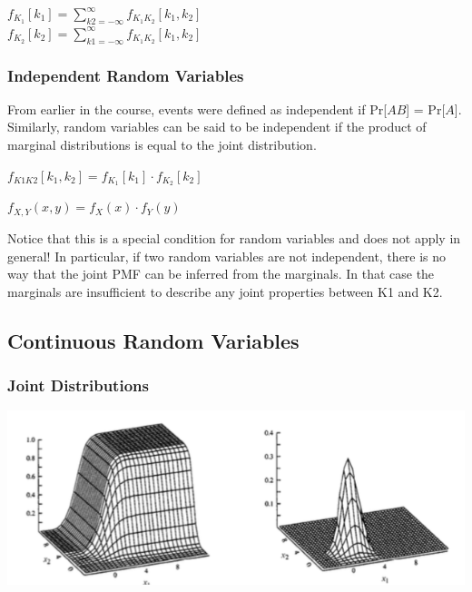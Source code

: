 \documentclass[11pt]{article}
\begin{document}
\begin{center}
    $f_{K_1}[k_1] = \sum\limits_{k2=-\infty}^\infty f_{K_1K_2}[k_1,k_2]$ \\

    $f_{K_2}[k_2] = \sum\limits_{k1=-\infty}^\infty f_{K_1K_2}[k_1,k_2]$    
\end{center}


\subsubsection{Independent Random Variables}

From earlier in the course, events were defined as independent if Pr[$AB$] = Pr[$A$]. Similarly, random variables can be said to be independent if the product of marginal distributions is equal to the joint distribution.
\begin{center}
    $f_{K1K2}[k_1,k_2] = f_{K_1}[k_1]\cdot f_{K_2}[k_2]$
\end{center}

\begin{center}
    $f_{X,Y}(x,y) = f_{X}(x)\cdot f_{Y}(y)$
\end{center}

Notice that this is a special condition for random variables and does not apply in general! In particular, if two random variables are not independent, there is no way that the joint PMF can be inferred from the marginals. In that case the marginals are insufficient to describe any joint properties between K1 and K2.

\subsection{Continuous Random Variables}

\subsubsection{Joint Distributions}

\begin{center}
    \includegraphics[width=300 px]{img/joint-cdf}  \\
\end{center}
\end{document}
